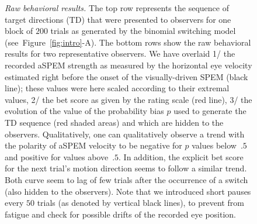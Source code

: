 \documentclass[12pt,english]{article}%
\newcommand{\seeFig}[1]{Figure~\ref{fig:#1}}
\begin{document}
\begin{figure}%
\caption{
\emph{Raw behavioral results.} %
The top row represents the sequence of target directions (TD)
that were presented to observers
for one block of $200$ trials
as generated by the binomial switching model (see~\seeFig{intro}-A).
The bottom rows show the raw behavioral results 
for two representative observers.
We have overlaid 
1/ the recorded aSPEM strength as measured by the horizontal eye velocity estimated right before
the onset of the visually-driven SPEM (black line);
these values were here scaled according to their extremal values,
2/ the bet score as given by the rating scale (red line),
3/ the evolution of the value 
of the probability bias $p$ used to generate the TD sequence (red shaded areas)
and which are hidden to the observers.
Qualitatively, one can qualitatively observe a trend with the polarity of aSPEM velocity
to be negative for $p$ values below~$.5$ and positive for values above~$.5$.
In addition, the explicit bet score
for the next trial's motion direction
seems to follow a similar trend.
Both curve seem to lag of few trials 
after the occurrence of a switch
(also hidden to the observers).
Note that we introduced short pauses every $50$ trials (as denoted by vertical black lines), to prevent from fatigue and check for possible drifts of the recorded eye position.
}
\label{fig:results_raw}
\end{figure}
\end{document}
